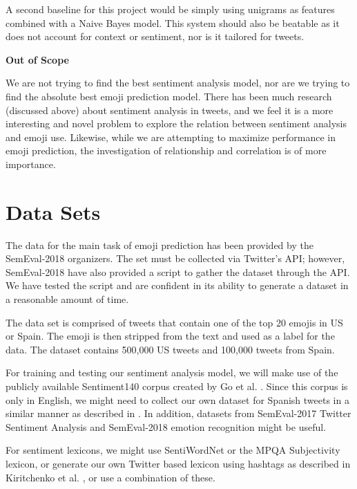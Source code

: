 \documentclass[10pt]{article}
\begin{document}
A second baseline for this project would be simply using unigrams as features combined with a Naive Bayes model. This system should also be beatable as it does not account for context or sentiment, nor is it tailored for tweets. %

\textbf{Out of Scope}

We are not trying to find the best sentiment analysis model, nor are we trying to find the absolute best emoji prediction model. There has been much research (discussed above) about sentiment analysis in tweets, and we feel it is a more interesting and novel problem to explore the relation between sentiment analysis and emoji use. Likewise, while we are attempting to maximize performance in emoji prediction, the investigation of relationship and correlation is of more importance.

\section{Data Sets}

The data for the main task of emoji prediction has been provided by the SemEval-2018 organizers. The set must be collected via Twitter's API; however, SemEval-2018 have also provided a script to gather the dataset through the API. We have tested the script and are confident in its ability to generate a dataset in a reasonable amount of time.

The data set is comprised of tweets that contain one of the top 20 emojis in US or Spain. The emoji is then stripped from the text and used as a label for the data. The dataset contains 500,000 US tweets and 100,000 tweets from Spain.

For training and testing our sentiment analysis model, we will make use of the publicly available Sentiment140 corpus created by Go et al. \cite{go2009twitter}. Since this corpus is only in English, we might need to collect our own dataset for Spanish tweets in a similar manner as described in \cite{go2009twitter}. In addition, datasets from SemEval-2017 Twitter Sentiment Analysis and SemEval-2018 emotion recognition might be useful.

For sentiment lexicons, we might use SentiWordNet or the MPQA Subjectivity lexicon, or generate our own Twitter based lexicon using hashtags as described in Kiritchenko et al. \cite{kiritchenko2014sentiment}, or use a combination of these.
\end{document}
